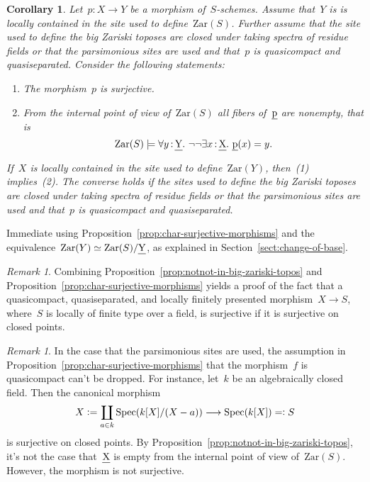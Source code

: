 \documentclass[10pt,reqno,a4paper]{amsbook}
\makeatletter
\theoremstyle{definition}
\theoremstyle{plain}
\newtheorem{cor}[defn]{Corollary}
\theoremstyle{remark}
\newtheorem{rem}[defn]{Remark}
\let\oldul\ul
\renewcommand{\ul}[1]{\text{\oldul{$#1$}}}
\newcommand{\Zar}{\mathrm{Zar}}
\DeclareMathOperator{\Spec}{Spec}
\newcommand{\?}{\,{:}\,}
\renewcommand{\_}{\mathpunct{.}\,}
\newcommand{\lra}{\longrightarrow}
\newcommand{\defeq}{\vcentcolon=}
\renewenvironment{proof}[1][\proofname]{\par
  \pushQED{\qed}%
  \normalfont \topsep6\p@\@plus6\p@\relax
  \trivlist
  \item[\hskip\labelsep
        \itshape
    #1\@addpunct{.}]\ignorespaces
}{%
  \popQED\endtrivlist\@endpefalse
}
\makeatother
\begin{document}
\begin{cor}\label{cor:char-surjective-morphisms-relative}
Let~$p : X \to Y$ be a morphism of~$S$-schemes. Assume that~$Y$ is is locally
contained in the site used to define~$\Zar(S)$.
Further assume that the site used to define the big Zariski toposes are closed
under taking spectra of residue fields or that the parsimonious sites are used
and that~$p$ is quasicompact and quasiseparated.
Consider the following statements:
\begin{enumerate}
\item The morphism~$p$ is surjective.
\item From the internal point of view of~$\Zar(S)$ all fibers of~$\ul{p}$ are
nonempty, that is
\[ \Zar(S) \models \forall y\?\ul{Y}\_
  \neg\neg \exists x\?\ul{X}\_ \ul{p}(x) = y. \]
\end{enumerate}
If~$X$ is locally contained in the
site used to define~$\Zar(Y)$, then~(1) implies~(2). The converse holds if the
sites used to define the big Zariski toposes are closed under taking spectra of
residue fields or that the parsimonious sites are used and that~$p$ is
quasicompact and quasiseparated.
\end{cor}

\begin{proof}Immediate using Proposition~\ref{prop:char-surjective-morphisms}
and the equivalence~$\Zar(Y) \simeq \Zar(S)/\ul{Y}$,
as explained in Section~\ref{sect:change-of-base}.
\end{proof}

\begin{rem}Combining Proposition~\ref{prop:notnot-in-big-zariski-topos} and
Proposition~\ref{prop:char-surjective-morphisms} yields a proof of the fact
that a quasicompact, quasiseparated, and locally finitely presented morphism~$X \to S$, where~$S$ is locally of
finite type over a field, is surjective if it is surjective on closed points.
\end{rem}

\begin{rem}In the case that the parsimonious sites are used, the assumption in
Proposition~\ref{prop:char-surjective-morphisms} that the morphism~$f$ is
quasicompact can't be dropped. For instance, let~$k$ be an
algebraically closed field. Then the canonical morphism
\[ X \defeq \coprod_{a \in k} \Spec(k[X]/(X-a)) \lra \Spec(k[X]) =\vcentcolon S \]
is surjective on closed points. By Proposition~\ref{prop:notnot-in-big-zariski-topos},
it's not the case that~$\ul{X}$ is empty from the internal point of view
of~$\Zar(S)$. However, the morphism is not surjective.
\end{rem}
\end{document}
